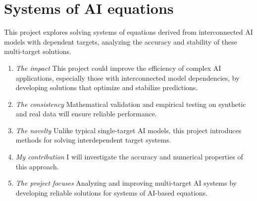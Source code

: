 \documentclass[12pt]{article}
\begin{document}
\section{Systems of AI equations}
This project explores solving systems of equations derived from interconnected AI models with dependent targets, analyzing the accuracy and stability of these multi-target solutions.
\begin{enumerate}
\item \emph{The impact} This project could improve the efficiency of complex AI applications, especially those with interconnected model dependencies, by developing solutions that optimize and stabilize predictions.
\item \emph{The consistency} Mathematical validation and empirical testing on synthetic and real data will ensure reliable performance.
\item \emph{The novelty} Unlike typical single-target AI models, this project introduces methods for solving interdependent target systems.
\item \emph{My contribution} I will investigate the accuracy and numerical properties of this approach.
\item \emph{The project focuses} Analyzing and improving multi-target AI systems by developing reliable solutions for systems of AI-based equations.
\end{enumerate}

\end{document}
